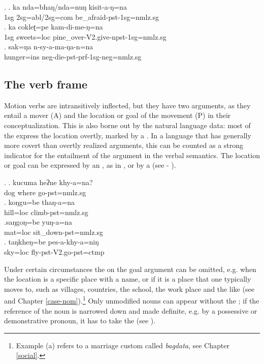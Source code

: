 \ex. \ag.  ka nda=bhaŋ/nda=nuŋ kisit-a-ŋ=na\\
	{\sc 1sg} {\sc 2sg=abl/2sg=com} be\_afraid-{\sc pst-1sg=nmlz.sg}\\
\bg. ka cokleʈ=pe kam-di-me-ŋ=na\\
	{\sc 1sg} sweets{\sc =loc} pine\_over-{\sc V2.give-npst-1sg=nmlz.sg}\\
\bg. sak=ŋa n-sy-a-ma-ŋa-n=na\\
			hunger{\sc =ins} {\sc neg-}die{\sc -pst-prf-1sg-neg=nmlz.sg}\\
				
\subsection{The  verb frame}\label{itr-motion}
 
\noindent 
Motion verbs are intransitively inflected, but they have two arguments, as they entail a mover (A) and the location or goal of the movement (P) in their conceptualization. This is also borne out by the natural language data: most of the  express the location overtly, marked by a . In a language that has generally more covert than overtly realized arguments, this can be counted as a strong indicator for the entailment of the  argument in the verbal semantics. The location or goal can be expressed by an , as in \Next[a], or by a  (see \Next[b] - \Next[d]). 

\ex. \ag. kucuma heʔne khy-a=na?\\
		dog where go{\sc [3sg]-pst=nmlz.sg} 	\\
	\bg. koŋgu=be thaŋ-a=na\\
		hill{\sc =loc} climb{\sc [3sg]-pst=nmlz.sg}\\
	\bg.saŋgoŋ=be yuŋ-a=na\\
	 mat{\sc =loc} sit\_down{\sc [3sg]-pst=nmlz.sg}\\
	\bg.  taŋkheŋ=be  pes-a-khy-a=niŋ\\
	 sky{\sc =loc} fly{\sc [3sg]-pst-V2.go-pst=ctmp}		\\
	 	


Under certain circumstances the  on the goal argument can be omitted, e.g. when the location is a specific place with a name, or if it is a place that one typically moves to, such as villages, countries, the school, the work place and the like (see \Next and Chapter \ref{case-nom}).\footnote{Example (a) refers to a marriage custom called \emph{bagdata}, see Chapter \ref{social}.}  Only unmodified nouns can appear without the ; if the reference of the noun is narrowed down and made definite, e.g. by a possessive or demonstrative pronoun, it has to take the   (see \Next[c]).   

